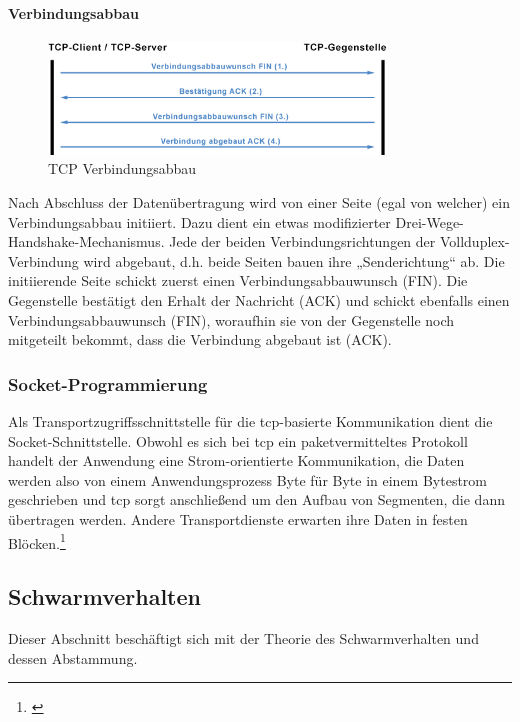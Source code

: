 \paragraph{Verbindungsabbau}
\begin{figure}[h]
	\centering
	\includegraphics[width=0.8\textwidth]{images/Verbindungsabbau.png}
	\caption[TCP Verbindungsabbau]{TCP Verbindungsabbau \cite{Schnabel.TCPKommunikation}}
	\label{fig:<Sprungmakre>}
\end{figure}
Nach Abschluss der Datenübertragung wird von einer Seite (egal von welcher) ein Verbindungsabbau initiiert. Dazu dient ein etwas modifizierter Drei-Wege-Handshake-Mechanismus. Jede der beiden Verbindungsrichtungen der Vollduplex-Verbindung wird abgebaut, d.h. beide Seiten bauen ihre „Senderichtung“ ab. Die initiierende Seite schickt zuerst einen Verbindungsabbauwunsch (FIN). Die Gegenstelle bestätigt den Erhalt der Nachricht (ACK) und schickt ebenfalls einen Verbindungsabbauwunsch (FIN), woraufhin sie von der Gegenstelle noch mitgeteilt bekommt, dass die Verbindung abgebaut ist (ACK).
\subsubsection{Socket-Programmierung}
Als Transportzugriffsschnittstelle für die \gls{tcp}-basierte Kommunikation dient die Socket-Schnittstelle.
Obwohl es sich bei \gls{tcp} ein paketvermitteltes Protokoll handelt der Anwendung eine Strom-orientierte Kommunikation, die Daten werden also von einem Anwendungsprozess Byte für Byte in einem Bytestrom geschrieben und \gls{tcp} sorgt anschließend um den Aufbau von Segmenten, die dann übertragen werden. Andere Transportdienste erwarten ihre Daten in festen Blöcken.\footnote{\citep[vgl.][Grundkurs Datenkommunikation, Seite 96 f. f.]{Mandl.GrundkursDatenkommunikation}\label{note67}}

\newpage
\subsection{Schwarmverhalten}

Dieser Abschnitt beschäftigt sich mit der Theorie des Schwarmverhalten und dessen Abstammung.

